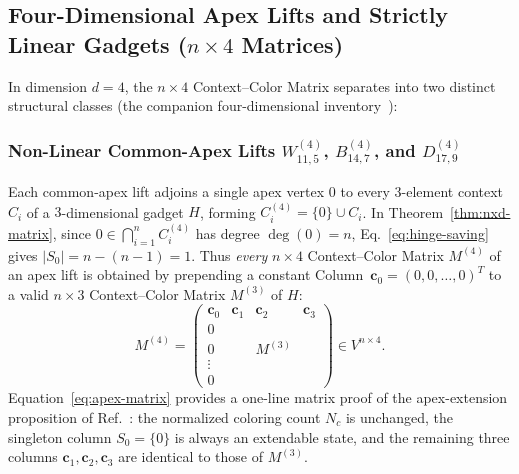 \documentclass[aps,pra,reprint,superscriptaddress,longbibliography,nofootinbib,floatfix,10pt]{revtex4-2}
\theoremstyle{definition}\newtheorem{definition}[theorem]{Definition}
\theoremstyle{remark}\newtheorem{remark}[theorem]{Remark}
\begin{document}
\subsection{Four-Dimensional Apex Lifts and Strictly Linear Gadgets (\texorpdfstring{$n\times 4$}{n x 4} Matrices)}\label{sec:4d-gadgets}

In dimension $d=4$, the $n\times 4$ Context--Color Matrix separates into two distinct structural classes (the companion four-dimensional inventory~\cite{svozil2026contexts}):

\subsubsection{Non-Linear Common-Apex Lifts \texorpdfstring{$W_{11,5}^{(4)}$, $B_{14,7}^{(4)}$, and $D_{17,9}^{(4)}$}{W11,5(4), B14,7(4), and D17,9(4)}}
Each common-apex lift adjoins a single apex vertex $0$ to every $3$-element context $C_i$ of a $3$-dimensional gadget $H$, forming $C_i^{(4)}=\{0\}\cup C_i$. In Theorem~\ref{thm:nxd-matrix}, since $0\in\bigcap_{i=1}^n C_i^{(4)}$ has degree $\deg(0)=n$, Eq.~\eqref{eq:hinge-saving} gives $|S_0|=n-(n-1)=1$. Thus \emph{every} $n\times 4$ Context--Color Matrix $M^{(4)}$ of an apex lift is obtained by prepending a constant Column~$\mathbf{c}_0=(0,0,\ldots,0)^T$ to a valid $n\times 3$ Context--Color Matrix $M^{(3)}$ of $H$:
\begin{equation}\label{eq:apex-matrix}
M^{(4)}=\left(\begin{array}{c|ccc}
\mathbf{c}_0 & \mathbf{c}_1 & \mathbf{c}_2 & \mathbf{c}_3\\\hline
0 & & & \\
0 & & M^{(3)} & \\
\vdots & & & \\
0 & & &
\end{array}\right)\in V^{n\times 4}.
\end{equation}
Equation~\eqref{eq:apex-matrix} provides a one-line matrix proof of the apex-extension proposition of Ref.~\cite{svozil2026contexts}: the normalized coloring count $N_c$ is unchanged, the singleton column $S_0=\{0\}$ is always an extendable state, and the remaining three columns $\mathbf{c}_1,\mathbf{c}_2,\mathbf{c}_3$ are identical to those of $M^{(3)}$.
\end{document}
